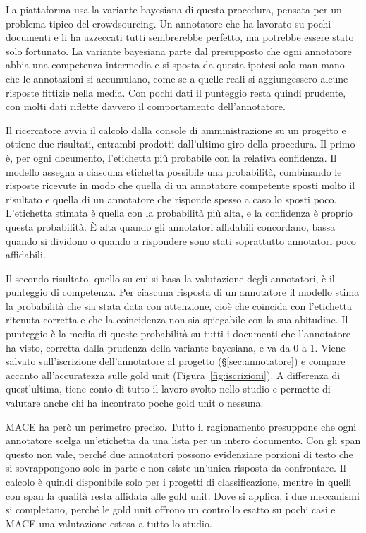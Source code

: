 \documentclass[]{sapthesis}
\begin{document}
La piattaforma usa la variante bayesiana di questa procedura, pensata per un problema tipico del crowdsourcing. Un annotatore che ha lavorato su pochi documenti e li ha azzeccati tutti sembrerebbe perfetto, ma potrebbe essere stato solo fortunato. La variante bayesiana parte dal presupposto che ogni annotatore abbia una competenza intermedia e si sposta da questa ipotesi solo man mano che le annotazioni si accumulano, come se a quelle reali si aggiungessero alcune risposte fittizie nella media. Con pochi dati il punteggio resta quindi prudente, con molti dati riflette davvero il comportamento dell'annotatore.

Il ricercatore avvia il calcolo dalla console di amministrazione su un progetto e ottiene due risultati, entrambi prodotti dall'ultimo giro della procedura. Il primo è, per ogni documento, l'etichetta più probabile con la relativa confidenza. Il modello assegna a ciascuna etichetta possibile una probabilità, combinando le risposte ricevute in modo che quella di un annotatore competente sposti molto il risultato e quella di un annotatore che risponde spesso a caso lo sposti poco. L'etichetta stimata è quella con la probabilità più alta, e la confidenza è proprio questa probabilità. È alta quando gli annotatori affidabili concordano, bassa quando si dividono o quando a rispondere sono stati soprattutto annotatori poco affidabili.

Il secondo risultato, quello su cui si basa la valutazione degli annotatori, è il punteggio di competenza. Per ciascuna risposta di un annotatore il modello stima la probabilità che sia stata data con attenzione, cioè che coincida con l'etichetta ritenuta corretta e che la coincidenza non sia spiegabile con la sua abitudine. Il punteggio è la media di queste probabilità su tutti i documenti che l'annotatore ha visto, corretta dalla prudenza della variante bayesiana, e va da 0 a 1. Viene salvato sull'iscrizione dell'annotatore al progetto (\S\ref{sec:annotatore}) e compare accanto all'accuratezza sulle gold unit (Figura~\ref{fig:iscrizioni}). A differenza di quest'ultima, tiene conto di tutto il lavoro svolto nello studio e permette di valutare anche chi ha incontrato poche gold unit o nessuna.

MACE ha però un perimetro preciso. Tutto il ragionamento presuppone che ogni annotatore scelga un'etichetta da una lista per un intero documento. Con gli span questo non vale, perché due annotatori possono evidenziare porzioni di testo che si sovrappongono solo in parte e non esiste un'unica risposta da confrontare. Il calcolo è quindi disponibile solo per i progetti di classificazione, mentre in quelli con span la qualità resta affidata alle gold unit. Dove si applica, i due meccanismi si completano, perché le gold unit offrono un controllo esatto su pochi casi e MACE una valutazione estesa a tutto lo studio.
\end{document}
